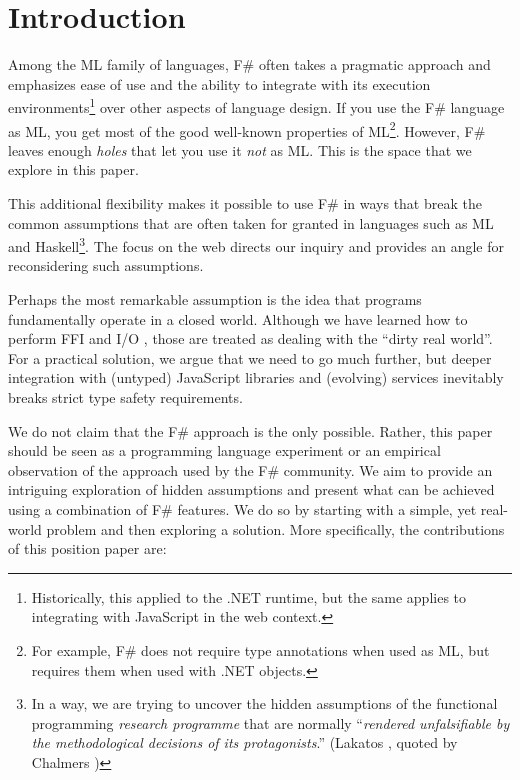 \documentclass[submission,copyright,creativecommons]{eptcs}
\begin{document}
\section{Introduction}

Among the ML family of languages, F\# often takes a pragmatic approach and emphasizes ease of use
and the ability to integrate with its execution environments\footnote{Historically, this applied 
to the .NET runtime, but the same applies to integrating with JavaScript in the web context.} over 
other aspects of language design. If you use the F\# language as ML, you get most of the good 
well-known properties of ML\footnote{For example, F\# does not require type annotations when used 
as ML, but requires them when used with .NET objects.}. However, F\# leaves enough \emph{holes} that
let you use it \emph{not} as ML. This is the space that we explore in this paper.

This additional flexibility makes it possible to use F\# in ways that break the common assumptions
that are often taken for granted in languages such as ML and Haskell\footnote{In a way, we are trying
to uncover the hidden assumptions of the functional programming \emph{research programme} that are
normally ``\emph{rendered unfalsifiable by the methodological decisions of its protagonists}.'' 
(Lakatos \cite{philosophy-lakatos}, quoted by Chalmers \cite{philosophy-thing})}. The focus on 
the web directs our inquiry and provides an angle for reconsidering such assumptions. 

Perhaps the most remarkable assumption is the idea that programs fundamentally operate in a closed
world. Although we have learned how to perform FFI and I/O \cite{haskell-ffi,haskell-imperative},
those are treated as dealing with the ``dirty real world''. For a practical solution, we argue that
we need to go much further, but deeper integration with (untyped) JavaScript libraries and (evolving) 
services inevitably breaks strict type safety requirements.

We do not claim that the F\# approach is the only possible. Rather, this paper should be seen
as a programming language experiment \cite{philosophy-pl} or an empirical observation of the 
approach used by the F\# community. We aim to provide an intriguing exploration of hidden assumptions 
and present what can be achieved using a combination of F\# features. We do so by starting with 
a simple, yet real-world problem and then exploring a solution. More specifically, the contributions 
of this position paper are:
\end{document}
